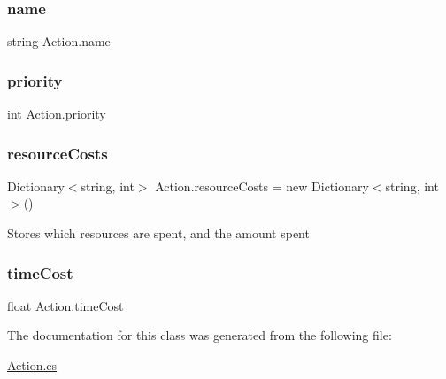 \mbox{\label{class_action_a3f620f4d21284b95ed2eac1319467747}} 
\subsubsection{\texorpdfstring{name}{name}}
{\footnotesize\ttfamily string Action.\+name}

\mbox{\label{class_action_a77b619eb64443ae5f2b729a85a7d7207}} 
\subsubsection{\texorpdfstring{priority}{priority}}
{\footnotesize\ttfamily int Action.\+priority}

\mbox{\label{class_action_afb7d5f622f869e401fcb9edd5961b2fe}} 
\subsubsection{\texorpdfstring{resource\+Costs}{resourceCosts}}
{\footnotesize\ttfamily Dictionary$<$string, int$>$ Action.\+resource\+Costs = new Dictionary$<$string, int$>$()}



Stores which resources are spent, and the amount spent 

\mbox{\label{class_action_a56a4045ce411430256a399031b32ead6}} 
\subsubsection{\texorpdfstring{time\+Cost}{timeCost}}
{\footnotesize\ttfamily float Action.\+time\+Cost}



The documentation for this class was generated from the following file\+:\begin{DoxyCompactItemize}
\item 
\mbox{\hyperlink{_action_8cs}{Action.\+cs}}\end{DoxyCompactItemize}
